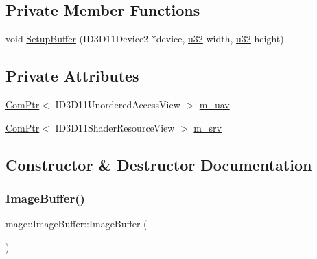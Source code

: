 \subsection*{Private Member Functions}
\begin{DoxyCompactItemize}
\item 
void \hyperlink{structmage_1_1_image_buffer_a9f9da805ed9a5d304b5885ed8f1c862c}{Setup\+Buffer} (I\+D3\+D11\+Device2 $\ast$device, \hyperlink{namespacemage_af2b398bf98eb10351f49cad73fe2cc73}{u32} width, \hyperlink{namespacemage_af2b398bf98eb10351f49cad73fe2cc73}{u32} height)
\end{DoxyCompactItemize}
\subsection*{Private Attributes}
\begin{DoxyCompactItemize}
\item 
\hyperlink{namespacemage_ae74f374780900893caa5555d1031fd79}{Com\+Ptr}$<$ I\+D3\+D11\+Unordered\+Access\+View $>$ \hyperlink{structmage_1_1_image_buffer_abd30a4842e00bb7729b3c92029e34ee0}{m\+\_\+uav}
\item 
\hyperlink{namespacemage_ae74f374780900893caa5555d1031fd79}{Com\+Ptr}$<$ I\+D3\+D11\+Shader\+Resource\+View $>$ \hyperlink{structmage_1_1_image_buffer_a3909901d1e896e85664b68b59c7c166c}{m\+\_\+srv}
\end{DoxyCompactItemize}


\subsection{Constructor \& Destructor Documentation}
\hypertarget{structmage_1_1_image_buffer_a56adf7564a85ec33716e40fbd0d1956c}{}\label{structmage_1_1_image_buffer_a56adf7564a85ec33716e40fbd0d1956c} 
\subsubsection{\texorpdfstring{Image\+Buffer()}{ImageBuffer()}\hspace{0.1cm}{\footnotesize\ttfamily [1/4]}}
{\footnotesize\ttfamily mage\+::\+Image\+Buffer\+::\+Image\+Buffer (\begin{DoxyParamCaption}{ }\end{DoxyParamCaption})}

\hypertarget{structmage_1_1_image_buffer_aaa39b98fe308c01bcb4b9aa719c79149}{}\label{structmage_1_1_image_buffer_aaa39b98fe308c01bcb4b9aa719c79149} 
